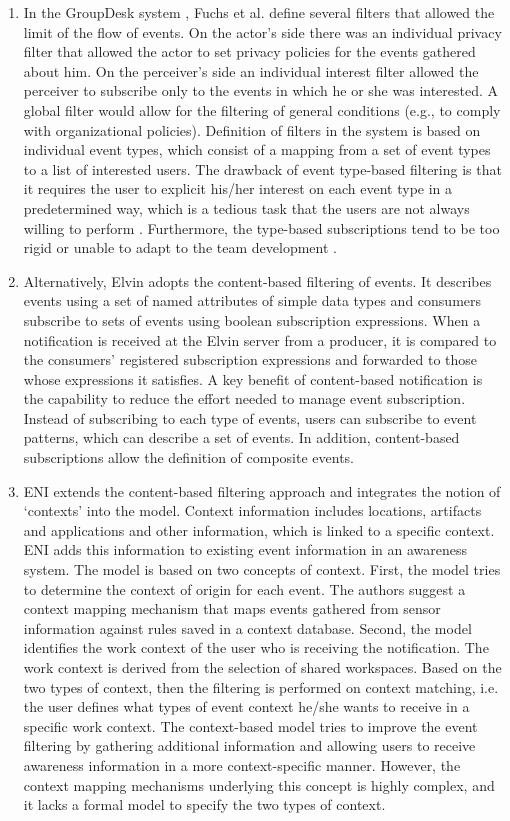 \begin{enumerate}
   \item In the GroupDesk system \cite{Fuchs1995}, Fuchs et al. define several filters that allowed the limit of the flow of events. On the actor’s side there was an individual privacy filter that allowed the actor to set privacy policies for the events gathered about him. On the perceiver’s side an individual interest filter allowed the perceiver to subscribe only to the events in which he or she was interested. A global filter would allow for the filtering of general conditions (e.g., to comply with organizational policies). Definition of filters in the system is based on individual event types, which consist of a mapping from a set of event types to a list of interested users. The drawback of event type-based filtering is that it requires the user to explicit his/her interest on each event type in a predetermined way, which is a tedious task that the users are not always willing to perform \cite{Grudin1994}. Furthermore, the type-based subscriptions tend to be too rigid or unable to adapt to the team development \cite{Alarcon2002}.
   \item Alternatively, Elvin \cite{Fitzpatrick2002} adopts the content-based filtering of events. It describes events using a set of named attributes of simple data types and consumers subscribe to sets of events using boolean subscription expressions. When a notification is received at the Elvin server from a producer, it is compared to the consumers’ registered subscription expressions and forwarded to those whose expressions it satisfies. A key benefit of content-based notification is the capability to reduce the effort needed to manage event subscription. Instead of subscribing to each type of events, users can subscribe to event patterns, which can describe a set of events. In addition, content-based subscriptions allow the definition of composite events.
   \item ENI \cite{Gross2004} extends the content-based filtering approach and integrates the notion of `contexts' into the model. Context information includes locations, artifacts and applications and other information, which is linked to a specific context. ENI adds this information to existing event information in an awareness system. The model is based on two concepts of context. First, the model tries to determine the context of origin for each event. The authors suggest a context mapping mechanism that maps events gathered from sensor information against rules saved in a context database. Second, the model identifies the work context of the user who is receiving the notification. The work context is derived from the selection of shared workspaces. Based on the two types of context, then the filtering is performed on context matching, i.e. the user defines what types of event context he/she wants to receive in a specific work context. The context-based model tries to improve the event filtering by gathering additional information and allowing users to receive awareness information in a more context-specific manner. However, the context mapping mechanisms underlying this concept is highly complex, and it lacks a formal model to specify the two types of context.
\end{enumerate}
